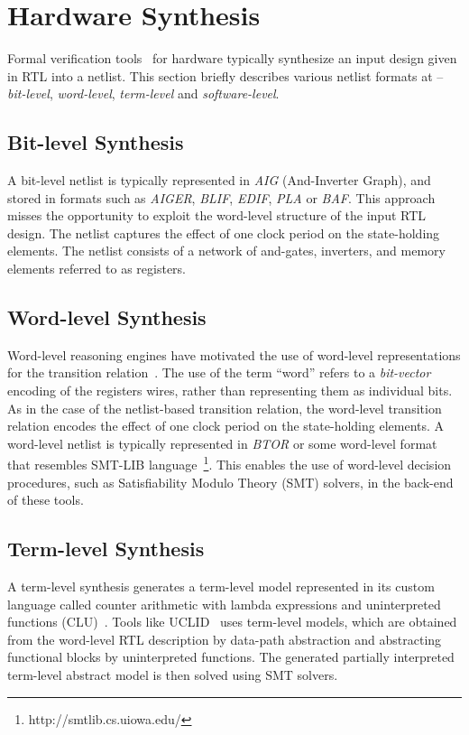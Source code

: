 \section{Hardware Synthesis}\label{sec:abstraction}
%
Formal verification tools~\cite{abc,DBLP:conf/fmcad/BradleyM07,vis} for 
hardware typically synthesize an input design given in RTL into a netlist.  
This section briefly describes various netlist formats at -- \emph{bit-level},
\emph{word-level}, \emph{term-level} and \emph{software-level}.  
%
%
\subsection{Bit-level Synthesis}
A bit-level netlist is typically represented in \emph{AIG} 
(And-Inverter Graph), and stored in formats such as 
\emph{AIGER}, \emph{BLIF}, \emph{EDIF}, \emph{PLA} or \emph{BAF}.  
This approach misses the opportunity to exploit the word-level 
structure of the input RTL design.  The netlist captures the 
effect of one clock period on the state-holding elements.  The 
netlist consists of a network of and-gates, inverters, and memory 
elements referred to as registers.

\subsection{Word-level Synthesis}
Word-level reasoning engines have motivated the use of word-level
representations for the transition
relation~\cite{DBLP:conf/mtv/SunkariCVM07,soc-keating}. The use of the term
``word'' refers to a \textit{bit-vector} encoding of the registers 
wires, rather than representing them as individual bits.  
As in the case of the netlist-based transition relation, the word-level 
transition relation encodes the effect of one clock period on the 
state-holding elements. A word-level netlist is typically represented 
in \emph{BTOR} or some word-level format that resembles SMT-LIB 
language~\footnote{http://smtlib.cs.uiowa.edu/}.  
This enables the use of word-level decision procedures, such as 
Satisfiability Modulo Theory (SMT) solvers, in the back-end of these tools.  

\subsection{Term-level Synthesis}
A term-level synthesis generates a term-level model represented 
in its custom language called counter arithmetic with lambda 
expressions and uninterpreted functions (CLU)~\cite{uclid}.  Tools 
like UCLID~\cite{uclid} uses term-level models, which are obtained 
from the word-level RTL description by data-path abstraction and 
abstracting functional blocks by uninterpreted functions.  The 
generated partially interpreted term-level abstract model is then 
solved using SMT solvers.  


